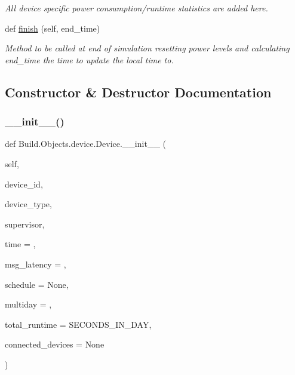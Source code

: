 \begin{DoxyCompactItemize}
\begin{DoxyCompactList}\small\item\em All device specific power consumption/runtime statistics are added here. \end{DoxyCompactList}\item 
def \hyperlink{class_build_1_1_objects_1_1device_1_1_device_a0eb251de12fe74493c71a50713b5ac3a}{finish} (self, end\+\_\+time)
\begin{DoxyCompactList}\small\item\em Method to be called at end of simulation resetting power levels and calculating end\+\_\+time the time to update the local time to. \end{DoxyCompactList}\end{DoxyCompactItemize}


\subsection{Constructor \& Destructor Documentation}
\mbox{\label{class_build_1_1_objects_1_1device_1_1_device_a6e8b7318d7bce8142f9c482c1852e744}} 
\subsubsection{\texorpdfstring{\+\_\+\+\_\+init\+\_\+\+\_\+()}{\_\_init\_\_()}}
{\footnotesize\ttfamily def Build.\+Objects.\+device.\+Device.\+\_\+\+\_\+init\+\_\+\+\_\+ (\begin{DoxyParamCaption}\item[{}]{self,  }\item[{}]{device\+\_\+id,  }\item[{}]{device\+\_\+type,  }\item[{}]{supervisor,  }\item[{}]{time = {},  }\item[{}]{msg\+\_\+latency = {},  }\item[{}]{schedule = {\ttfamily None},  }\item[{}]{multiday = {},  }\item[{}]{total\+\_\+runtime = {\ttfamily SECONDS\+\_\+IN\+\_\+DAY},  }\item[{}]{connected\+\_\+devices = {\ttfamily None} }\end{DoxyParamCaption})}



